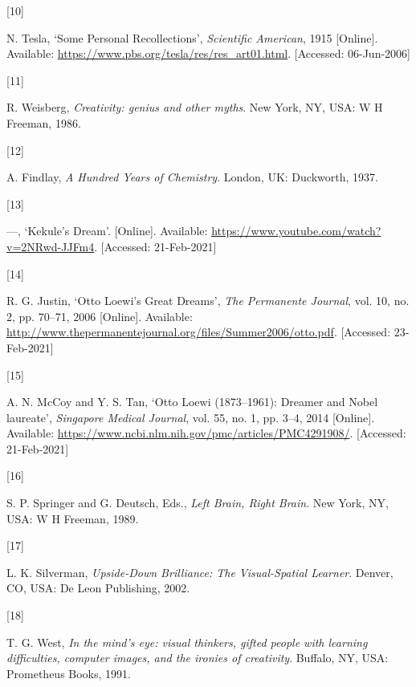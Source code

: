 \documentclass[
  a4paper,
]{article}
\newlength{\cslhangindent}
\newlength{\csllabelwidth}
\newlength{\cslentryspacingunit} %
\newenvironment{CSLReferences}[2] %
 {%
  \setlength{\parindent}{0pt}
  \ifodd #1
  \let\oldpar\par
  \def\par{\hangindent=\cslhangindent\oldpar}
  \fi
  \setlength{\parskip}{#2\cslentryspacingunit}
 }%
 {}
\newcommand{\CSLLeftMargin}[1]{\parbox[t]{\csllabelwidth}{#1}}
\newcommand{\CSLRightInline}[1]{\parbox[t]{\linewidth - \csllabelwidth}{#1}\break}
\begin{document}
\begin{CSLReferences}{0}{0}
\leavevmode{}%
\CSLLeftMargin{{[}10{]} }
\CSLRightInline{N. Tesla, {`{Some Personal Recollections}'},
\emph{Scientific American}, 1915 {[}Online{]}. Available:
\url{https://www.pbs.org/tesla/res/res_art01.html}. {[}Accessed:
06-Jun-2006{]}}

\leavevmode{}%
\CSLLeftMargin{{[}11{]} }
\CSLRightInline{R. Weisberg, \emph{{Creativity: genius and other
myths}}. New York, NY, USA: W H Freeman, 1986. }

\leavevmode{}%
\CSLLeftMargin{{[}12{]} }
\CSLRightInline{A. Findlay, \emph{{A Hundred Years of Chemistry}}.
London, UK: Duckworth, 1937. }

\leavevmode{}%
\CSLLeftMargin{{[}13{]} }
\CSLRightInline{---, {`{Kekule's Dream}'}. {[}Online{]}. Available:
\url{https://www.youtube.com/watch?v=2NRwd-JJFm4}. {[}Accessed:
21-Feb-2021{]}}

\leavevmode{}%
\CSLLeftMargin{{[}14{]} }
\CSLRightInline{R. G. Justin, {`{Otto Loewi's Great Dreams}'}, \emph{The
Permanente Journal}, vol. 10, no. 2, pp. 70--71, 2006 {[}Online{]}.
Available:
\url{http://www.thepermanentejournal.org/files/Summer2006/otto.pdf}.
{[}Accessed: 23-Feb-2021{]}}

\leavevmode{}%
\CSLLeftMargin{{[}15{]} }
\CSLRightInline{A. N. McCoy and Y. S. Tan, {`{Otto Loewi (1873--1961):
Dreamer and Nobel laureate}'}, \emph{Singapore Medical Journal}, vol.
55, no. 1, pp. 3--4, 2014 {[}Online{]}. Available:
\url{https://www.ncbi.nlm.nih.gov/pmc/articles/PMC4291908/}.
{[}Accessed: 21-Feb-2021{]}}

\leavevmode{}%
\CSLLeftMargin{{[}16{]} }
\CSLRightInline{S. P. Springer and G. Deutsch, Eds., \emph{{Left Brain,
Right Brain}}. New York, NY, USA: W H Freeman, 1989. }

\leavevmode{}%
\CSLLeftMargin{{[}17{]} }
\CSLRightInline{L. K. Silverman, \emph{{Upside-Down Brilliance: The
Visual-Spatial Learner}}. Denver, CO, USA: De Leon Publishing, 2002. }

\leavevmode{}%
\CSLLeftMargin{{[}18{]} }
\CSLRightInline{T. G. West, \emph{{In the mind's eye: visual thinkers,
gifted people with learning difficulties, computer images, and the
ironies of creativity}}. Buffalo, NY, USA: Prometheus Books, 1991. }


\end{CSLReferences}
\end{document}
